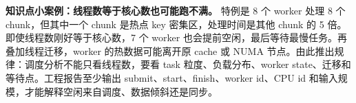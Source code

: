 \begin{casebox}
\textbf{知识点小案例：线程数等于核心数也可能跑不满。}
特例是 8 个 worker 处理 8 个 chunk，但其中一个 chunk 是热点 key 密集区，处理时间是其他 chunk 的 5 倍。即使线程数刚好等于核心数，7 个 worker 也会提前空闲，最后等待最慢任务。再叠加线程迁移，worker 的热数据可能离开原 cache 或 NUMA 节点。由此推出规律：调度分析不能只看线程数，要看 task 粒度、负载分布、worker state、迁移和等待点。工程报告至少输出 submit、start、finish、worker id、CPU id 和输入规模，才能解释空闲来自调度、数据倾斜还是同步。
\end{casebox}
